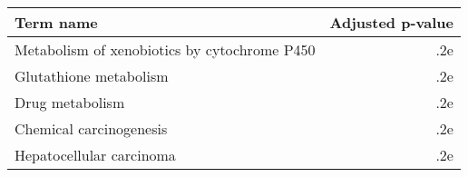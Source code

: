 \begin{tabular}{lr}
\toprule
                                   Term name &  Adjusted p-value \\
\midrule
Metabolism of xenobiotics by cytochrome P450 &               .2e \\
                      Glutathione metabolism &               .2e \\
                             Drug metabolism &               .2e \\
                     Chemical carcinogenesis &               .2e \\
                    Hepatocellular carcinoma &               .2e \\
\bottomrule
\end{tabular}
